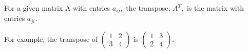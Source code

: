 For a given matrix A with entries $a_{ij},$  the transpose, $A^{T},$ 
is the matrix with entries $a_{ji}.$ 
\par
For example, the transpose of 
$ \left ( 
\begin{array}{cc} 
  1 & 2 \\
  3 & 4 
\end{array} 
\right ) $ is
$ \left ( 
\begin{array}{cc} 
  1 & 3 \\
  2 & 4 
\end{array} 
\right ) . $
